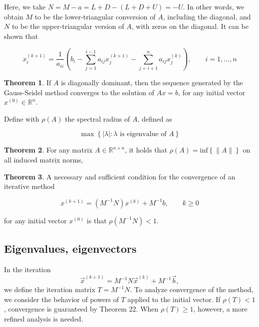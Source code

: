 \documentclass[12pt]{article}
\theoremstyle{definition}
\newtheorem{theorem}{Theorem}
\begin{document}
Here, we take $N = M - a = L + D - (L + D + U) = -U$. In other words, we obtain 
$M$ to be the lower-triangular conversion of $A$, including the diagonal, and
$N$ to be the upper-triangular version of $A$, with zeros on the diagonal. It
can be shown that 

\begin{equation*}
    x_i^{(k+1)} = \frac{1}{a_{ii}} \left( b_i - \sum_{j=1}^{i-1}
    a_{ij}x_j^{(k+1)} - \sum_{j=i+1}^n a_{ij} x_j^{(k)}\right), \qquad i = 1,
    \ldots, n
\end{equation*}

\begin{theorem}
    If $A$ is diagonally dominant, then the sequence generated by the
    Gauss-Seidel method converges to the solution of $Ax = b$, for any 
    initial vector $x^{(0)} \in \mathbb{R}^n$.
\end{theorem}

Define with $\rho(A)$ the spectral radius of $A$, defined as 

\begin{equation*}
    \max \left\{ |\lambda| : \lambda \text{ is eigenvalue of } A \right\} 
\end{equation*}

\begin{theorem}
    For any matrix $A \in \mathbb{R}^{n\times n}$, it holds that 
    $\rho(A) = \text{inf}\left\{ \|A\| \right\} $ on all induced matrix norms, 
\end{theorem}

\begin{theorem}
    A necessary and sufficient condition for the convergence of an iterative
    method 

    \begin{equation*}
        x^{(k+1)} = (M^{-1}N)x^{(k)} + M^{-1}b, \qquad k \geq 0
    \end{equation*}

    for any initial vector $x^{(0)}$ is that $\rho\left( M^{-1}N \right) < 1$.
\end{theorem}

\subsection{Eigenvalues, eigenvectors}


In the iteration 
\[
\vec{x}^{(k+1)} = M^{-1}N \vec{x}^{(k)} + M^{-1}\vec{b},
\]
we define the iteration matrix \( T = M^{-1}N \). To analyze convergence of the method, we consider the behavior of powers of \( T \) applied to the initial vector. If \( \rho(T) < 1 \), convergence is guaranteed by Theorem 22. When \( \rho(T) \geq 1 \), however, a more refined analysis is needed.
\end{document}
